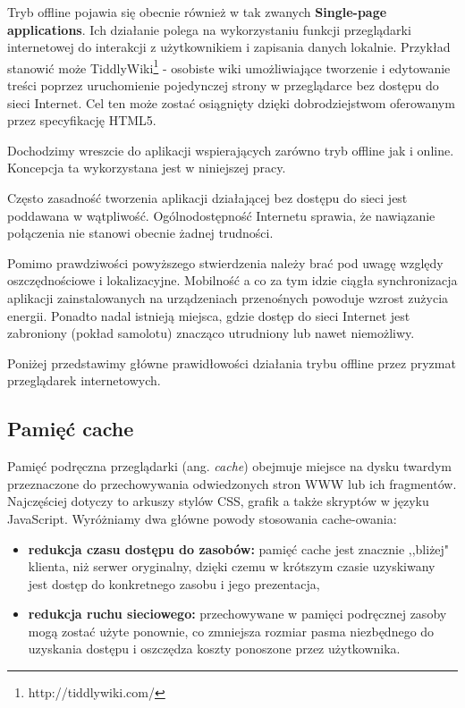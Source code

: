 Tryb offline pojawia się obecnie również w tak zwanych \textbf{Single-page applications}. Ich działanie polega na wykorzystaniu funkcji przeglądarki internetowej do interakcji z użytkownikiem i zapisania danych lokalnie. Przykład stanowić może TiddlyWiki\footnote{http://tiddlywiki.com/} - osobiste wiki umożliwiające tworzenie i edytowanie treści poprzez uruchomienie pojedynczej strony w przeglądarce bez dostępu do sieci Internet. Cel ten może zostać osiągnięty dzięki dobrodziejstwom oferowanym przez specyfikację HTML5.

Dochodzimy wreszcie do aplikacji wspierających zarówno tryb offline jak i online. Koncepcja ta wykorzystana jest w niniejszej pracy.

Często zasadność tworzenia aplikacji działającej bez dostępu do sieci jest poddawana w wątpliwość. Ogólnodostępność Internetu sprawia, że nawiązanie połączenia nie stanowi obecnie żadnej trudności.

Pomimo prawdziwości powyższego stwierdzenia należy brać pod uwagę względy oszczędnościowe i lokalizacyjne. Mobilność a co za tym idzie ciągła synchronizacja aplikacji zainstalowanych na urządzeniach przenośnych powoduje wzrost zużycia energii. Ponadto nadal istnieją miejsca, gdzie dostęp do sieci Internet jest zabroniony (pokład samolotu) znacząco utrudniony lub nawet niemożliwy.

Poniżej przedstawimy główne prawidłowości działania trybu offline przez pryzmat przeglądarek internetowych.

\subsection{Pamięć cache}
\label{sec:pamiecCache}

Pamięć podręczna przeglądarki\cite{pamiecPodreczna} (ang. \emph{cache}) obejmuje miejsce na dysku twardym przeznaczone do przechowywania odwiedzonych stron WWW lub ich fragmentów. Najczęściej dotyczy to arkuszy stylów CSS, grafik a także skryptów w języku JavaScript. Wyróżniamy dwa główne powody stosowania cache-owania:

\begin{itemize}
\item \textbf{redukcja czasu dostępu do zasobów:} pamięć cache jest znacznie ,,bliżej"{} klienta, niż serwer oryginalny, dzięki czemu w krótszym czasie uzyskiwany jest dostęp do konkretnego zasobu i jego prezentacja,
\item \textbf{redukcja ruchu sieciowego:} przechowywane w pamięci podręcznej zasoby mogą zostać użyte ponownie, co zmniejsza rozmiar pasma niezbędnego do uzyskania dostępu i oszczędza koszty ponoszone przez użytkownika.
\end{itemize}

